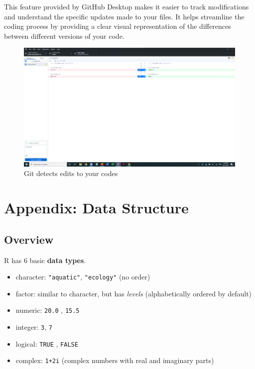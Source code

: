 \documentclass[
]{book}
\providecommand{\tightlist}{%
  \setlength{\itemsep}{0pt}\setlength{\parskip}{0pt}}
\begin{document}
This feature provided by GitHub Desktop makes it easier to track modifications and understand the specific updates made to your files. It helps streamline the coding process by providing a clear visual representation of the differences between different versions of your code.

\begin{figure}

{\centering \includegraphics[width=61.11in]{image/git_image06} 

}

\caption{Git detects edits to your codes}\label{fig:gitdesktop5}
\end{figure}

\hypertarget{appendix-data-structure}{%
\chapter{Appendix: Data Structure}\label{appendix-data-structure}}

\hypertarget{overview}{%
\section{Overview}\label{overview}}

R has 6 basic \textbf{data types}.

\begin{itemize}
\tightlist
\item
  character: \texttt{"aquatic"}, \texttt{"ecology"} (no order)
\item
  factor: similar to character, but has \emph{levels} (alphabetically ordered by default)
\item
  numeric: \texttt{20.0} , \texttt{15.5}
\item
  integer: \texttt{3}, \texttt{7}
\item
  logical: \texttt{TRUE} , \texttt{FALSE}
\item
  complex: \texttt{1+2i} (complex numbers with real and imaginary parts)
\end{itemize}
\end{document}
